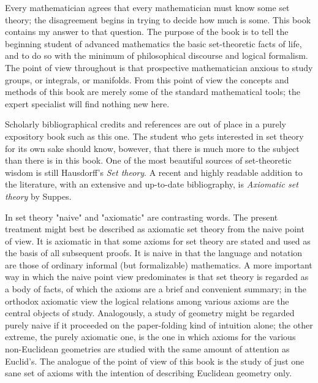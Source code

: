 

Every mathematician agrees that every mathematician must know some set theory; the disagreement begins in trying to decide how much is some. This book contains my answer to that question. The purpose of the book is to tell the beginning student of advanced mathematics the basic set-theoretic facts of life, and to do so with the minimum of philosophical discourse and logical  formalism. The point of view throughout is that prospective mathematician anxious to study groups, or integrals, or manifolds. From this point of view the concepts and methods of this book are merely some of the standard mathematical tools; the expert specialist will find nothing new here.

Scholarly bibliographical credits and references are out of place in a purely expository book such as this one. The student who gets interested in set theory for its own sake should know, bowever, that there is much more to the subject than there is in this book. One of the most beautiful sources of set-theoretic wisdom is still Hausdorff's \textit{Set theory}. A recent and highly readable addition to the literature, with an extensive and up-to-date bibliography, is \textit{Axiomatic set theory} by Suppes. 

In set theory "naive" and "axiomatic" are contrasting words. The present treatment might best be described as axiomatic set theory from the naive point of view. It is axiomatic in that some axioms for set theory are stated and used as the basis of all subsequent proofs. It is naive in that the language and notation are those of ordinary informal (but formalizable) mathematics. A more important way in which the naive point view predominates is that set theory is regarded as a body of facts, of which the axioms are a brief and convenient summary; in the orthodox axiomatic view the logical relations among various axioms are the central objects of study. Analogously, a study of geometry might be regarded purely naive if it proceeded on the paper-folding kind of intuition alone; the other extreme, the purely axiomatic one, is the one in which axioms for the various non-Euclidean geometries are studied with the same amount of attention as Euclid's. The analogue of the point of view of this book is the study of just one sane set of axioms with the intention of describing Euclidean geometry only.

